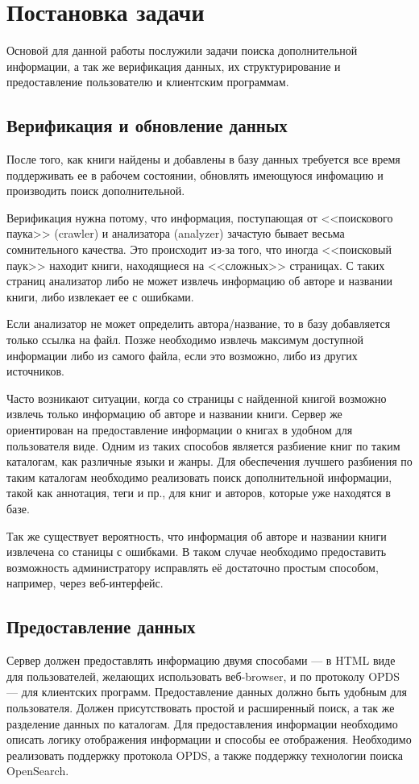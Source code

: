 \section{Постановка задачи}

Основой для данной работы послужили задачи поиска дополнительной информации, а так же верификация данных, их структурирование  и предоставление пользователю и клиентским программам.


\subsection{Верификация и обновление данных}

После того, как книги найдены и добавлены в базу данных требуется все время поддерживать ее в рабочем состоянии, обновлять имеющуюся инфомацию и производить поиск дополнительной.

Верификация нужна потому, что информация, поступающая от <<поискового паука>> (crawler) и анализатора (analyzer) зачастую бывает весьма сомнительного качества. Это происходит из-за того, что иногда <<поисковый паук>> находит книги, находящиеся на <<сложных>> страницах. С таких страниц анализатор либо не может извлечь информацию об авторе и названии книги, либо извлекает ее с ошибками. 

Если анализатор не может определить автора/название, то в базу добавляется только ссылка на файл. Позже необходимо извлечь максимум доступной информации либо из самого файла, если это возможно, либо из других источников.

Часто возникают ситуации, когда со страницы с найденной книгой возможно извлечь только информацию об авторе и названии книги. Сервер же ориентирован на предоставление информации о книгах в удобном для пользователя виде. Одним из таких способов является разбиение книг по таким каталогам, как различные языки и жанры. Для обеспечения лучшего разбиения по таким каталогам необходимо реализовать поиск дополнительной информации, такой как аннотация, теги и пр., для книг и авторов, которые уже находятся в базе.


Так же существует вероятность, что информация об авторе и названии книги извлечена со станицы с ошибками. В таком случае необходимо предоставить возможность администратору исправлять её достаточно простым способом, например, через веб-интерфейс.


\subsection{Предоставление данных}

Сервер должен предоставлять информацию двумя способами --- в HTML виде для пользователей, желающих использовать веб-browser, и по протоколу OPDS --- для клиентских программ. Предоставление данных должно быть удобным для пользователя. Должен присутствовать простой и расширенный поиск, а так же разделение данных по каталогам. Для предоставления информации необходимо описать логику отображения информации и способы ее отображения. Необходимо реализовать поддержку протокола OPDS, а также поддержку технологии поиска OpenSearch.

\newpage